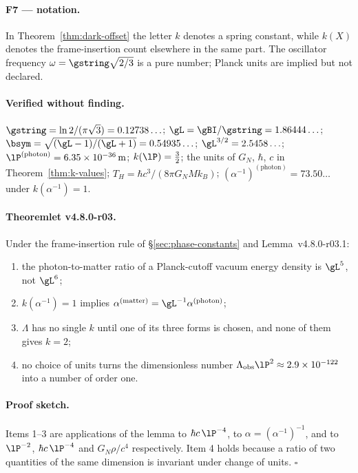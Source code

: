 \paragraph{F7 --- notation.}
In Theorem~\ref{thm:dark-offset} the letter \(k\) denotes a spring constant, while \(k(X)\)
denotes the frame-insertion count elsewhere in the same part.  The oscillator frequency
\(\omega=\gstring\sqrt{2/3}\) is a pure number; Planck units are implied but not declared.

\paragraph{Verified without finding.}
\(\gstring=\ln2/(\pi\sqrt3)=0.12738\ldots\);
\(\gL=\gBI/\gstring=1.86444\ldots\);
\(\bsym=\sqrt{(\gL-1)/(\gL+1)}=0.54935\ldots\);
\(\gL^{3/2}=2.5458\ldots\);
\(\lP^{(\mathrm{photon})}=6.35\times10^{-36}\,\mathrm{m}\);
\(k(\lP)=\tfrac32\);
the units of \(G_N\), \(\hbar\), \(c\) in Theorem~\ref{thm:k-values};
\(T_H=\hbar c^3/(8\pi G_NMk_B)\);
\((\alpha^{-1})^{(\mathrm{photon})}=73.50\ldots\) under \(k(\alpha^{-1})=1\).

\paragraph{Theoremlet v4.8.0-r03.}
Under the frame-insertion rule of \S\ref{sec:phase-constants} and Lemma~v4.8.0-r03.1:
\begin{enumerate}[leftmargin=2em]
 \item the photon-to-matter ratio of a Planck-cutoff vacuum energy density is \(\gL^{5}\), not
 \(\gL^{6}\);
 \item \(k(\alpha^{-1})=1\) implies \(\alpha^{(\mathrm{matter})}=\gL^{-1}\alpha^{(\mathrm{photon})}\);
 \item \(\Lambda\) has no single \(k\) until one of its three forms is chosen, and none of them
 gives \(k=2\);
 \item no choice of units turns the dimensionless number \(\Lambda_{\mathrm{obs}}\lP^2\approx
 2.9\times10^{-122}\) into a number of order one.
\end{enumerate}

\paragraph{Proof sketch.}
Items 1--3 are applications of the lemma to \(\hbar c\,\lP^{-4}\), to \(\alpha=(\alpha^{-1})^{-1}\),
and to \(\lP^{-2}\), \(\hbar c\,\lP^{-4}\) and \(G_N\rho/c^4\) respectively.  Item 4 holds because a
ratio of two quantities of the same dimension is invariant under change of units.  \(\square\)

